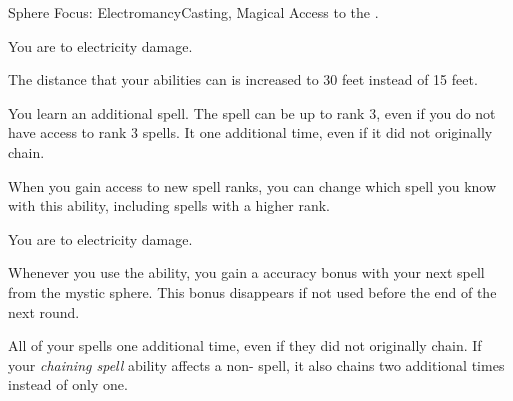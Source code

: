     \begin{magicalfeat}{Sphere Focus: Electromancy}{Casting, Magical}
        \featpre Access to the  .

         You are  to electricity damage.

         The distance that your abilities can  is increased to 30 feet instead of 15 feet.

         You learn an additional  spell.
        The spell can be up to rank 3, even if you do not have access to rank 3 spells.
        It  one additional time, even if it did not originally chain.

        When you gain access to new spell ranks, you can change which spell you know with this ability, including spells with a higher rank.

         You are  to electricity damage.

         Whenever you use the  ability, you gain a  accuracy bonus with your next spell from the  mystic sphere.
        This bonus disappears if not used before the end of the next round.

         All of your   spells  one additional time, even if they did not originally chain.
        If your \textit{chaining spell} ability affects a non- spell, it also chains two additional times instead of only one.
    \end{magicalfeat}

